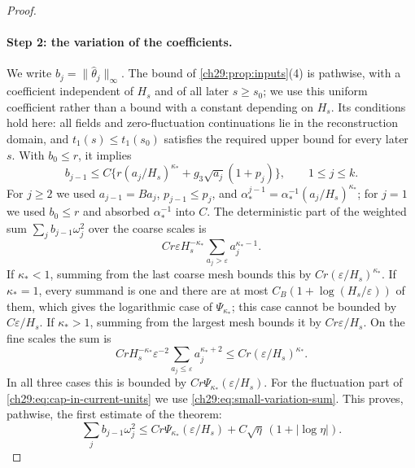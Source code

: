 \begin{proof}
\paragraph{Step 2: the variation of the coefficients.}
We write $b_j=\|\widehat\theta_j\|_\infty$. The bound of \cref{ch29:prop:inputs}(4) is pathwise, with a coefficient independent of $H_s$ and of all later $s\ge s_0$; we use this uniform coefficient rather than a bound with a constant depending on $H_s$. Its conditions hold here: all fields and zero-fluctuation continuations lie in the reconstruction domain, and $t_1(s)\le t_1(s_0)$ satisfies the required upper bound for every later $s$. With $b_0\le r$, it implies
\begin{equation}\label{ch29:eq:cap-in-current-units}
 b_{j-1}\le C\bigl\{r(a_j/H_s)^{\kappa_*}+g_3\sqrt{a_j}(1+p_j)\bigr\},\qquad1\le j\le k.
\end{equation}
For $j\ge2$ we used $a_{j-1}=Ba_j$, $p_{j-1}\le p_j$, and $\alpha_*^{j-1}=\alpha_*^{-1}(a_j/H_s)^{\kappa_*}$; for $j=1$ we used $b_0\le r$ and absorbed $\alpha_*^{-1}$ into $C$. The deterministic part of the weighted sum $\sum_jb_{j-1}\omega_j^2$ over the coarse scales is
\[
 Cr\varepsilon H_s^{-\kappa_*}\sum_{a_j>\varepsilon}a_j^{\kappa_*-1}.
\]
If $\kappa_*<1$, summing from the last coarse mesh bounds this by $Cr(\varepsilon/H_s)^{\kappa_*}$. If $\kappa_*=1$, every summand is one and there are at most $C_B(1+\log(H_s/\varepsilon))$ of them, which gives the logarithmic case of $\Psi_{\kappa_*}$; this case cannot be bounded by $C\varepsilon/H_s$. If $\kappa_*>1$, summing from the largest mesh bounds it by $Cr\varepsilon/H_s$. On the fine scales the sum is
\[
 CrH_s^{-\kappa_*}\varepsilon^{-2}\sum_{a_j\le\varepsilon}a_j^{\kappa_*+2}\le Cr(\varepsilon/H_s)^{\kappa_*}.
\]
In all three cases this is bounded by $Cr\Psi_{\kappa_*}(\varepsilon/H_s)$. For the fluctuation part of \eqref{ch29:eq:cap-in-current-units} we use \eqref{ch29:eq:small-variation-sum}. This proves, pathwise, the first estimate of the theorem:
\begin{equation}\label{ch29:eq:background-sum}
 \sum_jb_{j-1}\omega_j^2\le Cr\Psi_{\kappa_*}(\varepsilon/H_s)+C\sqrt\eta\,(1+|\log\eta|).
\end{equation}


\end{proof}
